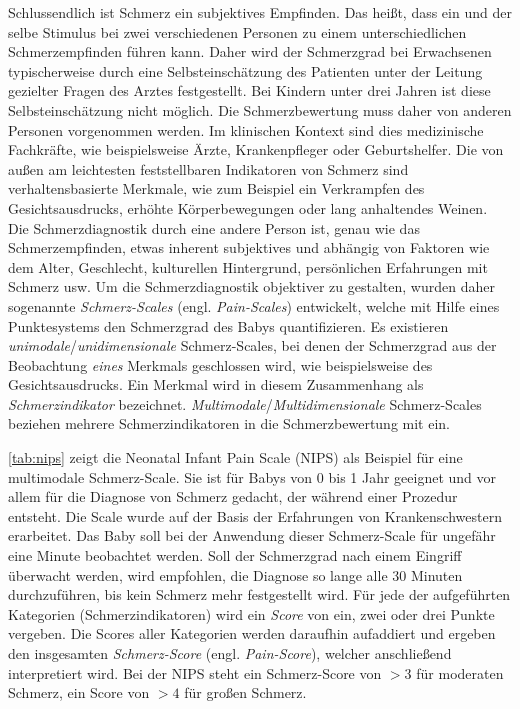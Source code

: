 Schlussendlich ist Schmerz ein subjektives Empfinden. Das heißt, dass ein und der selbe Stimulus bei zwei verschiedenen Personen zu einem unterschiedlichen Schmerzempfinden führen kann. Daher wird der Schmerzgrad bei Erwachsenen typischerweise durch eine Selbsteinschätzung des Patienten unter der Leitung gezielter Fragen des Arztes festgestellt. Bei Kindern unter drei Jahren ist diese Selbsteinschätzung nicht möglich. Die Schmerzbewertung muss daher von anderen Personen vorgenommen werden. Im klinischen Kontext sind dies medizinische Fachkräfte, wie beispielsweise Ärzte, Krankenpfleger oder Geburtshelfer. Die von außen am leichtesten feststellbaren Indikatoren von Schmerz sind verhaltensbasierte Merkmale, wie zum Beispiel ein Verkrampfen des Gesichtsausdrucks, erhöhte Körperbewegungen oder lang anhaltendes Weinen.\cite[S. 438]{PainAssessment01} Die Schmerzdiagnostik durch eine andere Person ist, genau wie das Schmerzempfinden, etwas inherent subjektives und abhängig von Faktoren wie dem Alter, Geschlecht, kulturellen Hintergrund, persönlichen Erfahrungen mit Schmerz usw.\cite[S. 3]{overview} Um die Schmerzdiagnostik objektiver zu gestalten, wurden daher sogenannte \emph{Schmerz-Scales} (engl. \emph{Pain-Scales}) entwickelt, welche mit Hilfe eines Punktesystems den Schmerzgrad des Babys quantifizieren.\cite[S. 438 - 439]{PainAssessment01} Es existieren \emph{unimodale}/\emph{unidimensionale} Schmerz-Scales, bei denen der Schmerzgrad aus der Beobachtung \emph{eines} Merkmals geschlossen wird, wie beispielsweise des Gesichtsausdrucks. Ein Merkmal wird in diesem Zusammenhang als \emph{Schmerzindikator} bezeichnet. \emph{Multimodale}/\emph{Multidimensionale} Schmerz-Scales beziehen mehrere Schmerzindikatoren in die Schmerzbewertung mit ein.\cite[S. 69 - 71]{PainAssessment02} \cite[S. 10 - 11, 31]{overview}

\autoref{tab:nips} zeigt die \glqq Neonatal Infant Pain Scale\grqq{} (NIPS) als Beispiel für eine multimodale Schmerz-Scale. Sie ist für Babys von 0 bis 1 Jahr geeignet und vor allem für die Diagnose von Schmerz gedacht, der während einer Prozedur entsteht. Die Scale wurde auf der Basis der Erfahrungen von Krankenschwestern erarbeitet. Das Baby soll bei der Anwendung dieser Schmerz-Scale für ungefähr eine Minute beobachtet werden. Soll der Schmerzgrad nach einem Eingriff überwacht werden, wird empfohlen, die Diagnose so lange alle 30 Minuten durchzuführen, bis kein Schmerz mehr festgestellt wird. Für jede der aufgeführten Kategorien (Schmerzindikatoren) wird ein \emph{Score} von ein, zwei oder drei Punkte vergeben. Die Scores aller Kategorien werden daraufhin aufaddiert und ergeben den insgesamten \emph{Schmerz-Score} (engl. \emph{Pain-Score}), welcher anschließend interpretiert wird. Bei der NIPS steht ein Schmerz-Score von $>3$ für \glqq moderaten Schmerz\grqq , ein Score von $>4$ für \glqq großen Schmerz\grqq.\cite{nips} \cite[S. 98]{painInNeonates}

